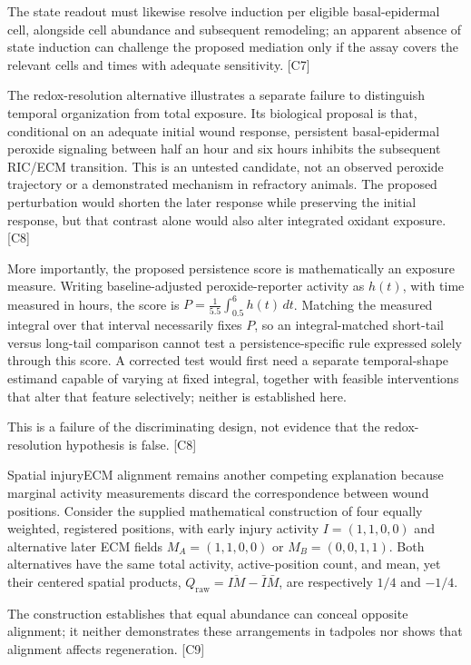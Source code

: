 \documentclass[11pt]{article}
\begin{document}
The state readout must likewise resolve induction per eligible basal-epidermal cell, alongside cell abundance and subsequent remodeling; an apparent absence of state induction can challenge the proposed mediation only if the assay covers the relevant cells and times with adequate sensitivity. [C7]

The redox-resolution alternative illustrates a separate failure to distinguish temporal organization from total exposure. Its biological proposal is that, conditional on an adequate initial wound response, persistent basal-epidermal peroxide signaling between half an hour and six hours inhibits the subsequent RIC/ECM transition. This is an untested candidate, not an observed peroxide trajectory or a demonstrated mechanism in refractory animals. The proposed perturbation would shorten the later response while preserving the initial response, but that contrast alone would also alter integrated oxidant exposure. [C8]

More importantly, the proposed persistence score is mathematically an exposure measure. Writing baseline-adjusted peroxide-reporter activity as $h(t)$, with time measured in hours, the score is $P=\frac{1}{5.5}\int_{0.5}^{6}h(t)\,dt$. Matching the measured integral over that interval necessarily fixes $P$, so an integral-matched short-tail versus long-tail comparison cannot test a persistence-specific rule expressed solely through this score. A corrected test would first need a separate temporal-shape estimand capable of varying at fixed integral, together with feasible interventions that alter that feature selectively; neither is established here.

This is a failure of the discriminating design, not evidence that the redox-resolution hypothesis is false. [C8]

Spatial injury\textendash{}ECM alignment remains another competing explanation because marginal activity measurements discard the correspondence between wound positions. Consider the supplied mathematical construction of four equally weighted, registered positions, with early injury activity $I=(1,1,0,0)$ and alternative later ECM fields $M_A=(1,1,0,0)$ or $M_B=(0,0,1,1)$. Both alternatives have the same total activity, active-position count, and mean, yet their centered spatial products, $Q_{\mathrm{raw}}=\overline{IM}-\bar I\bar M$, are respectively $1/4$ and $-1/4$.

The construction establishes that equal abundance can conceal opposite alignment; it neither demonstrates these arrangements in tadpoles nor shows that alignment affects regeneration. [C9]
\end{document}
